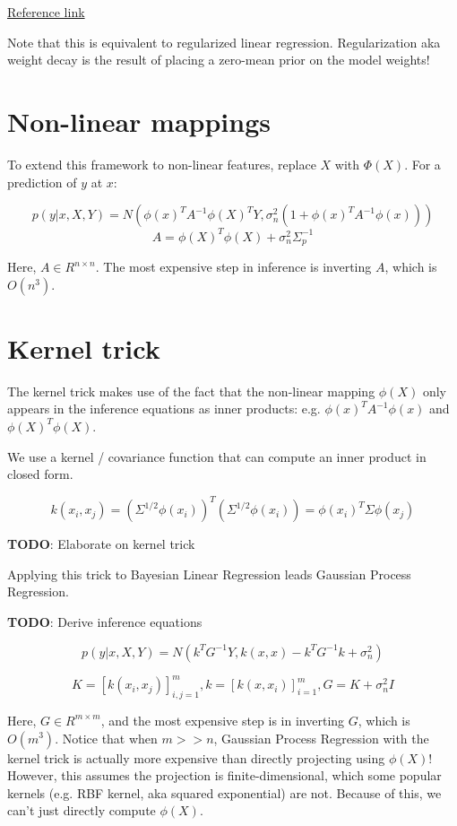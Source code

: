 \documentclass[a4paper]{article}
\begin{document}
\href{https://www.cs.utah.edu/~fletcher/cs6957/lectures/BayesianLinearRegression.pdf}{Reference link }

Note that this is equivalent to regularized linear regression. Regularization aka weight decay is the result of placing a zero-mean prior on the model weights! 

\section{Non-linear mappings}

To extend this framework to non-linear features, replace $X$ with $\Phi(X)$. For a prediction of $y$ at $x$: 

$$p(y | x, X, Y) = N(\phi(x)^T A^{-1} \phi(X)^T Y, \sigma_n^2 (1 +\phi(x)^T A^{-1} \phi(x)))$$
$$A = \phi(X)^T \phi(X) + \sigma_n^2 \Sigma_p^{-1}$$

Here, $A \in R^{n \times n}$. The most expensive step in inference is inverting $A$, which is $O(n^3)$. 

\section{Kernel trick}

The kernel trick makes use of the fact that the non-linear mapping $\phi(X)$ only appears in the inference equations as inner products: e.g. $\phi(x)^T A^{-1}\phi(x)$ and $\phi(X)^T \phi(X)$. 

We use a kernel / covariance function that can compute an inner product in closed form.

$$k(x_i, x_j) = (\Sigma^{1/2} \phi(x_i))^T (\Sigma^{1/2} \phi(x_i)) = \phi(x_i)^T \Sigma \phi(x_j)$$

\textbf{TODO}: Elaborate on kernel trick

Applying this trick to Bayesian Linear Regression leads Gaussian Process Regression.

\textbf{TODO}: Derive inference equations

$$p(y | x, X, Y) = N(k^T G^{-1}Y, k(x, x) - k^T G^{-1}k + \sigma_n^2)$$

$$K= [k(x_i, x_j)]_{i,j=1}^m, k = [k(x, x_i)]_{i=1}^m, G = K+\sigma_n^2 I$$ 

Here, $G \in R^{m \times m}$, and the most expensive step is in inverting $G$, which is $O(m^3)$. Notice that when $m>>n$, Gaussian Process Regression with the kernel trick is actually more expensive than directly projecting using $\phi(X)$! However, this assumes the projection is finite-dimensional, which some popular kernels (e.g. RBF kernel, aka squared exponential) are not. Because of this, we can't just directly compute $\phi(X)$.  
\end{document}
